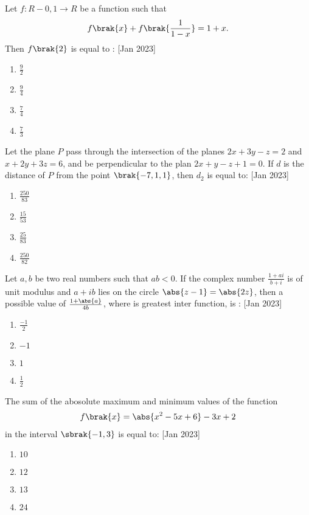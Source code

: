 	\item Let $f:R-{0,1} \rightarrow R$ be a function such that 
             \begin{align*}
		f\brak{x}+f\brak{\frac{1}{1-x}}=1+x.
             \end{align*}
		Then $f\brak{2}$ is equal to :
			\hfill{[Jan 2023]}
		\begin{enumerate}
			\item $\frac{9}{2}$
                        \item $\frac{9}{4}$
                        \item $\frac{7}{4}$
                        \item $\frac{7}{3}$
        	\end{enumerate}	
	\item  Let the plane $P$ pass through the intersection of the planes $2x+3y-z=2$ and $x+2y+3z=6$, and be perpendicular to the plan $2x+y-z+1=0$. If $d$ is the distance of $P$ from the point $\brak{-7,1,1}$, then $d_2$ is equal to:
		\hfill{[Jan 2023]}
		\begin{enumerate}
			\item $\frac{250}{83}$
			\item $\frac{15}{53}$
			\item $\frac{25}{83}$
			\item $\frac{250}{82}$
        	\end{enumerate}	
	\item Let $a, b$ be two real numbers such that $ab<0$. If the complex number $\frac{1+ai}{b+i}$ is of unit modulus and $a+ib $ lies on the circle $\abs{z-1}=\abs{2z}$, then a possible value of $\frac{1+\abs{a}}{4b}$, where  is greatest inter function, is : 
	\hfill{[Jan 2023]}
                \begin{enumerate}
			\item $\frac{-1}{2}$
			\item $-1$
			\item $1$
			\item $\frac{1}{2}$
        	\end{enumerate}		
	\item The sum of the abosolute maximum and minimum values of the function 
             \begin{align*}
		f\brak{x} =\abs{x^2-5x+6}-3x+2
             \end{align*}
		in the interval $\sbrak{-1,3}$ is equal to:
			\hfill{[Jan 2023]}
		\begin{enumerate}
			\item $10$
			\item $12$
			\item $13$
			\item $24$
        	\end{enumerate}	
